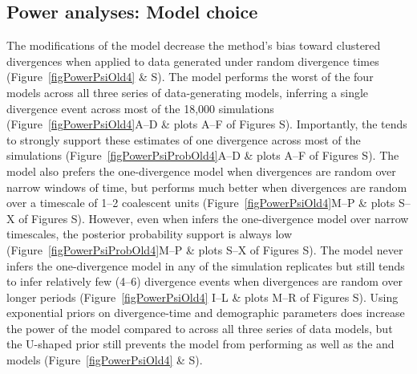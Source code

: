 \subsection{Power analyses: Model choice}
The modifications of the \msb model decrease the method's bias toward clustered
divergences when applied to data generated under random divergence times
(Figure~\ref{figPowerPsiOld4} \& 
S).
The \modelOld model performs the worst of the four models across
all three series of data-generating models, inferring a single divergence event across
most of the 18,000 simulations
(Figure~\ref{figPowerPsiOld4}A--D \& plots A--F of Figures
S).
Importantly, the \modelOld tends to strongly support these estimates
of one divergence across most of the simulations
(Figure~\ref{figPowerPsiProbOld4}A--D \& plots A--F of Figures
S).
The \modelDPP model also prefers the one-divergence model 
when divergences are random over narrow windows of time, but
performs much better when divergences are random over a timescale
of 1--2 coalescent units
(Figure~\ref{figPowerPsiOld4}M--P \& plots S--X of Figures
S).
However, even when \modelDPP infers the one-divergence model over narrow
timescales, the posterior probability support is always low
(Figure~\ref{figPowerPsiProbOld4}M--P \& plots S--X of Figures
S).
The \modelUniform model never infers the one-divergence model in any of the
simulation replicates but still tends to infer relatively few (4--6) divergence
events when divergences are random over longer periods 
(Figure~\ref{figPowerPsiOld4} I--L \& plots M--R of Figures
S).
Using exponential priors on divergence-time and demographic parameters does
increase the power of the \modelUshaped model compared to \modelOld across all
three series of data models, but the U-shaped prior still prevents the model
from performing as well as the \modelDPP and \modelUniform models 
(Figure~\ref{figPowerPsiOld4} \& 
S).


